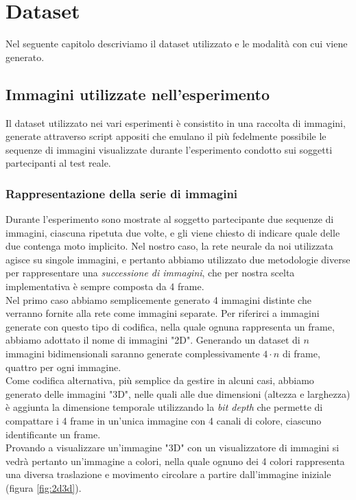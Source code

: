 
\chapter{Dataset}

Nel seguente capitolo descriviamo il dataset utilizzato e le modalità con cui viene generato.

\section{Immagini utilizzate nell'esperimento}

Il dataset utilizzato nei vari esperimenti è consistito in una raccolta di immagini, generate attraverso script appositi che emulano il più fedelmente possibile le sequenze di immagini visualizzate durante l'esperimento condotto sui soggetti partecipanti al test reale.

\subsection{Rappresentazione della serie di immagini}
\label{ssec:3d2ddim}

Durante l'esperimento sono mostrate al soggetto partecipante due sequenze di immagini, ciascuna ripetuta due volte, e gli viene chiesto di indicare quale delle due contenga moto implicito. Nel nostro caso, la rete neurale da noi utilizzata agisce su singole immagini, e pertanto abbiamo utilizzato due metodologie diverse per rappresentare una \textit{successione di immagini}, che per nostra scelta implementativa è sempre composta da 4 frame. \\
Nel primo caso abbiamo semplicemente generato 4 immagini distinte che verranno fornite alla rete come immagini separate. Per riferirci a immagini generate con questo tipo di codifica, nella quale ognuna rappresenta un frame, abbiamo adottato il nome di immagini "2D". Generando un dataset di $n$ immagini bidimensionali saranno generate complessivamente $4\cdot n$ di frame, quattro per ogni immagine. \\ 
Come codifica alternativa, più semplice da gestire in alcuni casi, abbiamo generato delle immagini "3D", nelle quali alle due dimensioni (altezza e larghezza) è aggiunta la dimensione temporale utilizzando la \textit{bit depth} che permette di compattare i 4 frame in un'unica immagine con 4 canali di colore, ciascuno identificante un frame.\\
Provando a visualizzare un'immagine "3D" con un visualizzatore di immagini si vedrà pertanto un'immagine a colori, nella quale ognuno dei 4 colori rappresenta una diversa traslazione e movimento circolare a partire dall'immagine iniziale (figura \ref{fig:2d3d}).

